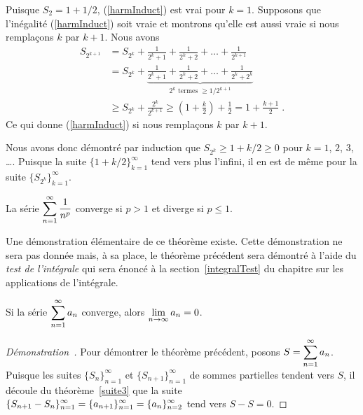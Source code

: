 {\begin{egg}[\theory\ \eng]
Puisque $S_2 = 1 + 1/2$, (\ref{harmInduct}) est vrai pour
$k=1$.  Supposons que l'inégalité (\ref{harmInduct}) soit vraie et
montrons qu'elle est aussi vraie si nous remplaçons $k$ par $k+1$.  Nous avons
\begin{align*}
S_{2^{k+1}} &= S_{2^k} + \frac{1}{2^k+1} + \frac{1}{2^k+2} + \ldots
+ \frac{1}{2^{k+1}} \\
&= S_{2^k} + \underbrace{\frac{1}{2^k+1} + \frac{1}{2^k+2} + \ldots
+ \frac{1}{2^k+2^k}}_{2^k \text{ termes } \geq 1/2^{k+1}} \\
&\geq S_{2^k} + \frac{2^k}{2^{k+1}}
\geq \left(1+\frac{k}{2}\right) + \frac{1}{2}
= 1 + \frac{k+1}{2} \; .
\end{align*}
Ce qui donne (\ref{harmInduct}) si nous remplaçons $k$ par $k+1$.

Nous avons donc démontré par induction que $S_{2^k} \geq 1 + k/2 \geq 0$
pour $k=1$, $2$, $3$, \ldots.  Puisque la suite
$\{1+k/2\}_{k=1}^\infty$ tend vers plus l'infini, il en est de même
pour la suite $\{S_{2^k}\}_{k=1}^\infty$.
\end{egg}

\begin{prop}
La série $\displaystyle \sum_{n=1}^\infty \frac{1}{n^p}$ converge si
$p>1$ et diverge si $p\leq 1$.
\label{Pseries}
\end{prop}

\begin{rmk}[\eng]
Une démonstration élémentaire de ce théorème existe.  Cette
démonstration ne sera pas donnée mais, à sa place, le théorème
précédent sera démontré à l'aide du {\em test de l'intégrale} qui sera
énoncé à la section~\ref{integralTest} du chapitre sur les
applications de l'intégrale.
\end{rmk}

\begin{theorem}
Si la série $\displaystyle \sum_{n=1}^\infty a_n$
converge, alors $\displaystyle \lim_{n\rightarrow \infty} a_n = 0$.
\label{condTC}
\end{theorem}

\begin{proof}[Démonstration\ \theory]
Pour démontrer le théorème précédent, posons
$\displaystyle S = \sum_{n=1}^\infty a_n$.  Puisque les suites
$\{S_n\}_{n=1}^\infty$ et $\{S_{n+1}\}_{n=1}^\infty$ de
sommes partielles tendent vers $S$, il découle du
théorème~\ref{suite3} que la suite
$\displaystyle \{S_{n+1}-S_n\}_{n=1}^\infty = \{ a_{n+1} \}_{n=1}^\infty
= \{ a_n \}_{n=2}^\infty$
tend vers $S-S=0$.
\end{proof}

}
